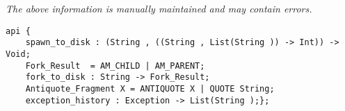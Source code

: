 \label{api:Lib7}

{\tiny \it The above information is manually maintained and may contain errors.}
\begin{verbatim}
api {
    spawn_to_disk : (String , ((String , List(String )) -> Int)) -> Void;
    Fork_Result  = AM_CHILD | AM_PARENT;
    fork_to_disk : String -> Fork_Result;
    Antiquote_Fragment X = ANTIQUOTE X | QUOTE String;
    exception_history : Exception -> List(String );};
\end{verbatim}
